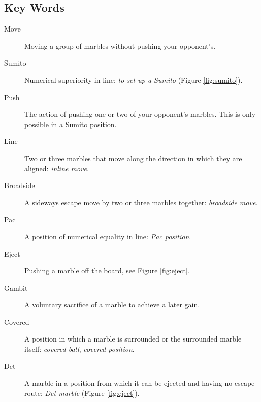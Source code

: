 \subsection*{Key Words}
\begin{description}
\item[Move]  Moving a group of marbles without pushing your opponent's.
\item[Sumito] Numerical superiority in line: {\it to set up a {\sc Sumito}} (Figure     \ref{fig:sumito}).
\item[Push] The action of pushing one or two of your opponent's marbles. This is only possible in a {\sc Sumito} position.
\item[Line] Two or three marbles that move along the direction in which they are aligned: {\it inline move}.
\item[Broadside] A sideways escape move by two or three marbles together: {\it broadside move}. \item[Pac] A position of numerical equality in line: {\it {\sc Pac} position}.
\item[Eject] Pushing a marble off the board, see Figure \ref{fig:eject}.
\item[Gambit] A voluntary sacrifice of a marble to achieve a later gain. 
\item[Covered] A position in which a marble is surrounded or the surrounded marble itself: {\it covered ball}, {\it covered position}.
\item[Det] A marble in a position from which it can be ejected and having no escape route: {\it {\sc Det} marble} (Figure \ref{fig:eject}). 
\end{description}

